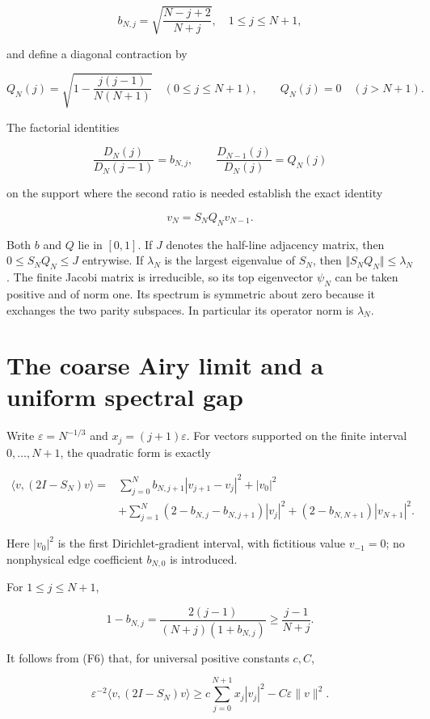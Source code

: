 \documentclass[11pt,letterpaper]{article}
\numberwithin{equation}{section}
\theoremstyle{remark}
\begin{document}
\[
b_{N,j}=\sqrt{\frac{N-j+2}{N+j}},\quad 1\le j\le N+1,
\]

and define a diagonal contraction by

\[
Q_N(j)=\sqrt{1-\frac{j(j-1)}{N(N+1)}}
\quad(0\le j\le N+1),\qquad Q_N(j)=0\quad(j>N+1).
\]

The factorial identities

\[
\frac{D_N(j)}{D_N(j-1)}=b_{N,j},\qquad
\frac{D_{N-1}(j)}{D_N(j)}=Q_N(j)
\]

on the support where the second ratio is needed establish the exact identity

\[
v_N=S_NQ_Nv_{N-1}.
\tag{F5}
\]

Both \(b\) and \(Q\) lie in \([0,1]\). If \(J\) denotes the half-line adjacency matrix, then \(0\le S_NQ_N\le J\) entrywise. If \(\lambda _N\) is the largest eigenvalue of \(S_N\), then \(\Vert S_NQ_N\Vert \le \lambda _N\). The finite Jacobi matrix is irreducible, so its top eigenvector \(\psi _N\) can be taken positive and of norm one. Its spectrum is symmetric about zero because it exchanges the two parity subspaces. In particular its operator norm is \(\lambda _N\).

\section{The coarse Airy limit and a uniform spectral gap}\label{air:rb:the-coarse-airy-limit-and-a-uniform-spectral-gap}

Write \(\varepsilon =N^{-1/3}\) and \(x_j=(j+1)\varepsilon\). For vectors supported on the finite interval \(0,\ldots ,N+1\), the quadratic form is exactly

\[
\begin{aligned}
\langle v,(2I-S_N)v\rangle={}&
\sum_{j=0}^{N}b_{N,j+1}|v_{j+1}-v_j|^2+|v_0|^2\\
&+\sum_{j=1}^{N}(2-b_{N,j}-b_{N,j+1})|v_j|^2
+(2-b_{N,N+1})|v_{N+1}|^2.
\end{aligned}
\tag{F6}
\]

Here \(|v_0|^2\) is the first Dirichlet-gradient interval, with fictitious value \(v_{-1}=0\); no nonphysical edge coefficient \(b_{N,0}\) is introduced.

For \(1\le j\le N+1\),

\[
1-b_{N,j}
=\frac{2(j-1)}{(N+j)(1+b_{N,j})}
\ge\frac{j-1}{N+j}.
\]

It follows from (F6) that, for universal positive constants \(c,C\),

\[
\varepsilon^{-2}\langle v,(2I-S_N)v\rangle
\ge c\sum_{j=0}^{N+1}x_j|v_j|^2-C\varepsilon\|v\|^2.
\tag{F7}
\]
\end{document}
